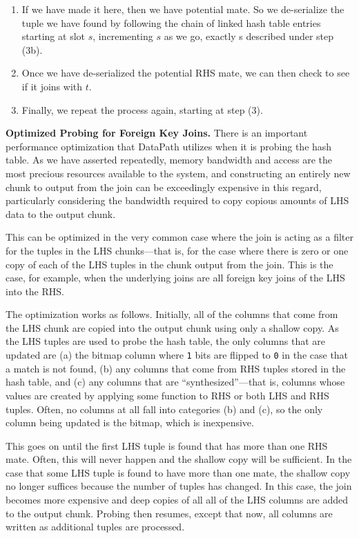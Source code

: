 \documentclass{sig-alternate}
\renewcommand\:{\colon} %
\begin{document}
\begin{enumerate}
\begin{enumerate}
\end{enumerate} 

\item If we have made it here, then we have potential mate.  So we de-serialize the tuple
we have found by following the chain of linked hash table
entries starting at slot $s$, incrementing $s$ as we go, exactly s described under step (3b).

\item Once we have de-serialized the potential RHS mate, we can then check
to see if it joins with $t$.

\item Finally, we repeat the process again, starting at step (3).
\end{enumerate} 
 
\vspace{5 pt}
\noindent
\textbf{Optimized Probing for Foreign Key Joins.}
There is an important performance optimization that DataPath utilizes when it is probing the hash table.  As we
have asserted repeatedly, memory
bandwidth and access are the most precious resources available to the system, and constructing an entirely
new chunk to output from the join can be exceedingly expensive in this regard, particularly considering the bandwidth
required to copy copious amounts of LHS data to the output chunk.  

This can be optimized in the very common case where the join is acting as a filter for the tuples in the LHS
chunks---that is, for the case where there is zero or one copy of each of the LHS tuples in the chunk output from the join.  
This is the case, for
example, when the underlying joins are all foreign key joins of the LHS into the RHS.

The optimization works as follows.  Initially, all of the columns that come from the LHS chunk are copied into the
output chunk using only a shallow copy. As the LHS tuples are used to probe the hash table, the only columns that
are updated are (a) the bitmap column where \texttt{1} bits are flipped to \texttt{0} in the case that
a match is not found, (b) any columns that come from RHS tuples stored in the hash table, 
and (c) any columns that are ``synthesized''---that is, columns whose values are created by applying some function to 
RHS or both LHS and RHS tuples.  Often, no columns at all fall into categories (b) and (c), so the only column being
updated is the bitmap, which is inexpensive.

This goes on until the first LHS tuple is found that has more than one RHS mate.  Often, this will never happen and
the shallow copy will be sufficient.  In the case that some LHS tuple is found to have more than one mate, the shallow copy no
longer suffices because the number of tuples has changed.  In this case, the join becomes more expensive and deep copies of all 
all of the LHS columns are added to the output chunk.  Probing then resumes,
except that now, all columns are written as additional tuples are processed.
\end{document}
